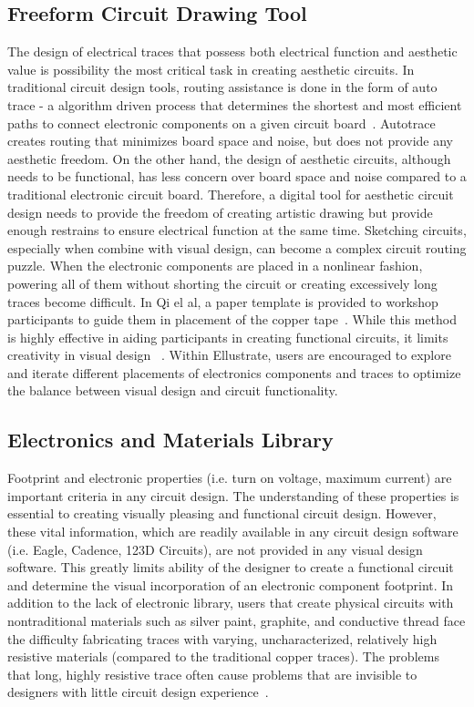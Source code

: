 \documentclass{sigchi}
\begin{document}
\subsection{Freeform Circuit Drawing Tool}
The design of electrical traces that possess both electrical function and aesthetic value is possibility the most critical task in creating aesthetic circuits. In traditional circuit design tools, routing assistance is done in the form of auto trace - a algorithm driven process that determines the shortest and most efficient paths to connect electronic components on a given circuit board~\cite{Fisk:1965tk}. Autotrace creates routing that minimizes board space and noise, but does not provide any aesthetic freedom. On the other hand, the design of aesthetic circuits, although needs to be functional, has less concern over board space and noise compared to a traditional electronic circuit board. Therefore, a digital tool for aesthetic circuit design needs to provide the freedom of creating artistic drawing but provide enough restrains to ensure electrical function at the same time.  Sketching circuits, especially when combine with visual design, can become a complex circuit routing puzzle. When the electronic components are placed in a nonlinear fashion, powering all of them without shorting the circuit or creating excessively long traces become difficult. In Qi el al, a paper template is provided to workshop participants to guide them in placement of the copper tape~\cite{Qi:2014bg}. While this method is highly effective in aiding participants in creating functional circuits, it limits creativity in visual design ~\cite{Qi:2014bg}.  Within Ellustrate, users are encouraged to explore and iterate different placements of electronics components and traces to optimize the balance between visual design and circuit functionality.



\subsection{Electronics and Materials Library}
Footprint and electronic properties (i.e. turn on voltage, maximum current) are important criteria in any circuit design. The understanding of these properties is essential to creating visually pleasing and functional circuit design. However, these vital information, which are readily available in any circuit design software (i.e. Eagle, Cadence, 123D Circuits), are not provided in any visual design software. This greatly limits ability of the designer to create a functional circuit and determine the visual incorporation of an electronic component footprint. In addition to the lack of electronic library, users that create physical circuits with nontraditional materials such as silver paint, graphite, and conductive thread face the difficulty fabricating traces with varying, uncharacterized, relatively high resistive materials (compared to the traditional copper traces). The problems that long, highly resistive trace often cause problems that are invisible to designers with little circuit design experience~\cite{admin:2009wf}. 
\end{document}
